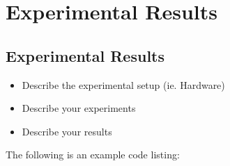
\glsresetall %
\chapter[Results]{Experimental Results}\label{ch:Experimental Results}

\section[Results]{Experimental Results}
\begin{itemize}
	\item{Describe the experimental setup (ie. Hardware)}
	\item{Describe your experiments}
	\item{Describe your results}
\end{itemize}


\clearpage

The following is an example code listing:


\lstset{language=python}
\lstset{tabsize=4}
\lstset{frame=single}
\lstset{label = ls.testPlot}
\lstset{caption = Test Plot Code }
{\tiny }

